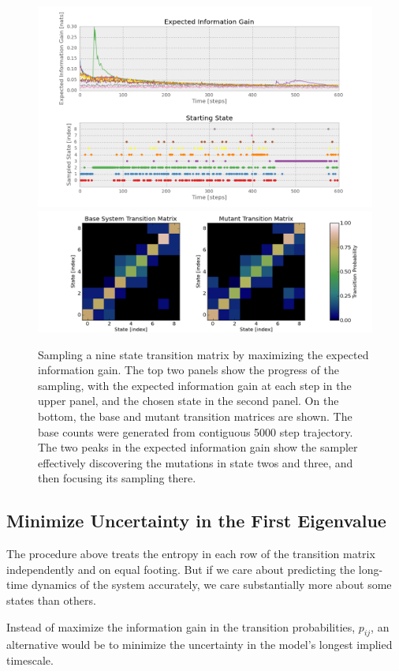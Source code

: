 \documentclass[twocolumn,floatfix,nofootinbib,aps]{revtex4-1}
\begin{document}
\begin{figure}[h]
\centering
\includegraphics[width=7in]{code/9x9graph/plots/information_gain.png}
\includegraphics[width=7in]{code/9x9graph/plots/transition_matricies.png}
\caption{Sampling a nine state transition matrix by maximizing the expected information gain. The top two panels show the progress of the sampling, with the expected information gain at each step in the upper panel, and the chosen state in the second panel. On the bottom, the base and mutant transition matrices are shown. The base counts were generated from contiguous 5000 step trajectory. The two peaks in the expected information gain show the sampler effectively discovering the mutations in state twos and three, and then focusing its sampling there.}
\end{figure}

\subsection{Minimize Uncertainty in the First Eigenvalue}

The procedure above treats the entropy in each row of the transition matrix independently and on equal footing. But if we care about predicting the long-time dynamics of the system accurately, we care substantially more about some states than others.

Instead of maximize the information gain in the transition probabilities, $p_{ij}$, an alternative would be to minimize the uncertainty in the model's longest implied timescale.
\end{document}
